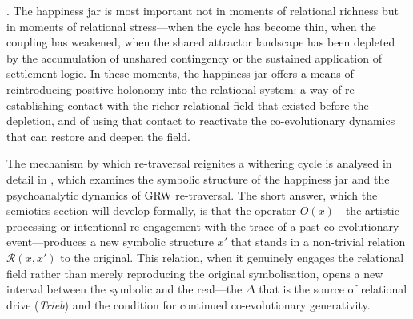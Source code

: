 . The happiness jar is most important not in moments of relational richness but in moments of relational stress---when the cycle has become thin, when the coupling has weakened, when the shared attractor landscape has been depleted by the accumulation of unshared contingency or the sustained application of settlement logic. In these moments, the happiness jar offers a means of reintroducing positive holonomy into the relational system: a way of re-establishing contact with the richer relational field that existed before the depletion, and of using that contact to reactivate the co-evolutionary dynamics that can restore and deepen the field.

The mechanism by which re-traversal reignites a withering cycle is analysed in detail in , which examines the symbolic structure of the happiness jar and the psychoanalytic dynamics of GRW re-traversal. The short answer, which the semiotics section will develop formally, is that the operator $O(x)$---the artistic processing or intentional re-engagement with the trace of a past co-evolutionary event---produces a new symbolic structure $x'$ that stands in a non-trivial relation $\mathcal{R}(x, x')$ to the original. This relation, when it genuinely engages the relational field rather than merely reproducing the original symbolisation, opens a new interval between the symbolic and the real---the $\Delta$ that is the source of relational drive (\emph{Trieb}) and the condition for continued co-evolutionary generativity.
